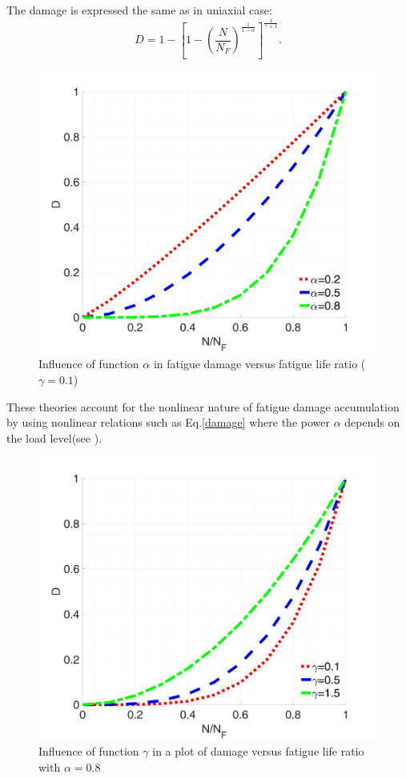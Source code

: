 The damage is expressed the same as in uniaxial case:
\begin{equation}D=1-\left[ 1-\left( \frac{N}{N_F}\right) ^{\frac{1}{1-\alpha}}\right] ^{\frac{1}{\gamma+1}}.
\label{damage}
\end{equation}

\begin{figure}[h!]
	\centering
	\includegraphics[width=\textwidth]{figures//Dratio1.png}
	\vspace{-12pt}
	\caption{Influence of function $\alpha$ in fatigue damage versus fatigue life ratio ($\gamma=0.1$)}
	\label{Alpha}
\end{figure}
These theories account for the nonlinear nature of fatigue damage accumulation by using nonlinear relations such as Eq.\eqref{damage} where the power $\alpha$ depends on the load level(see ).


\begin{figure}[h!]
	\centering
	\includegraphics[width=\textwidth]{figures//Dratio2.png}
	\vspace{-12pt}
	\caption{Influence of function $\gamma$ in a plot of  damage versus fatigue life ratio with $\alpha=0.8$}
\end{figure}

